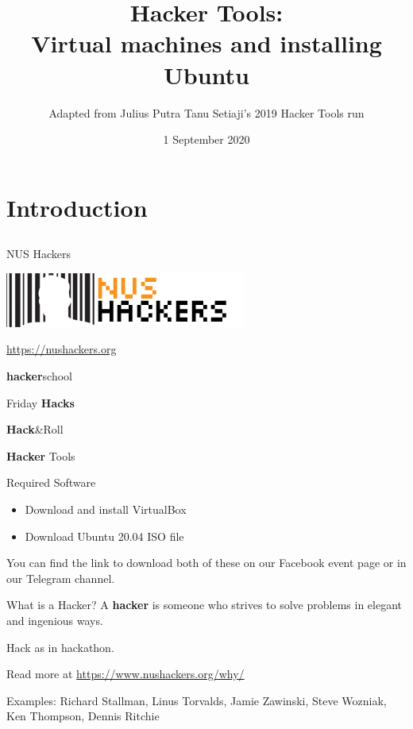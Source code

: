 \documentclass[12pt]{beamer}
\title{Hacker Tools: \\Virtual machines and installing Ubuntu}
\author{Adapted from Julius Putra Tanu Setiaji's 2019 Hacker Tools run}
\date{1 September 2020}
\begin{document}
\begin{frame}[plain]
\titlepage
\end{frame}

\section{Introduction}
\subsection{}

\begin{frame}{NUS Hackers}

  \begin{center}
    \includegraphics[width=0.5\linewidth]{../NUSHackers}

    \url{https://nushackers.org}
  \end{center}

  \begin{center}
    \textbf{hacker}school

    Friday \textbf{Hacks}

    \textbf{Hack}\&Roll

    \textbf{Hacker} Tools
  \end{center}

\end{frame}

\begin{frame}{Required Software}
  \begin{itemize}
    \item Download and install VirtualBox
    \item Download Ubuntu 20.04 ISO file
  \end{itemize}

  You can find the link to download both of these on our Facebook event page or in our Telegram channel.
\end{frame}

\begin{frame}{What is a Hacker?}
  A \textbf{hacker} is someone who strives to solve problems in elegant and ingenious ways.

  Hack as in hackathon.

  Read more at \url{https://www.nushackers.org/why/}

  Examples: Richard Stallman, Linus Torvalds, Jamie Zawinski, Steve Wozniak, Ken Thompson, Dennis Ritchie
\end{frame}
\end{document}
